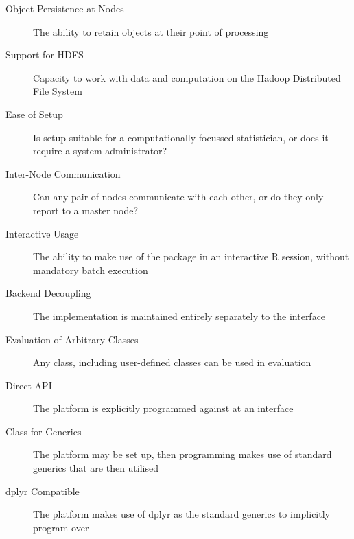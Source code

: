 \documentclass[a4paper,10pt]{article}
\begin{document}
\begin{description}
	\item[Object Persistence at Nodes] The ability to retain objects at their point
	      of processing
	\item[Support for HDFS] Capacity to work with data and computation on the
	      Hadoop Distributed File System
	\item[Ease of Setup] Is setup suitable for a computationally-focussed
	      statistician, or does it require a system administrator?
	\item[Inter-Node Communication] Can any pair of nodes communicate with each
	      other, or do they only report to a master node?
	\item[Interactive Usage] The ability to make use of the package in an
	      interactive R session, without mandatory batch execution
	\item[Backend Decoupling] The implementation is maintained entirely separately
	      to the interface
	\item[Evaluation of Arbitrary Classes] Any class, including user-defined
	      classes can be used in evaluation
	\item[Direct API] The platform is explicitly programmed against at an interface
	\item[Class for Generics] The platform may be set up, then programming makes
	      use of standard generics that are then utilised
	\item[dplyr Compatible] The platform makes use of dplyr as the standard
	      generics to implicitly program over
\end{description}
\end{document}
